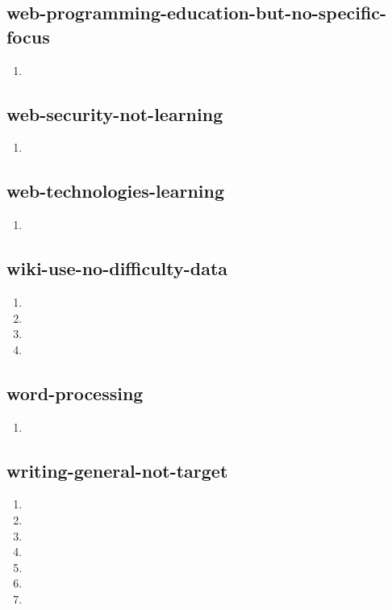 \documentclass{article}
\begin{document}
\subsection{web-programming-education-but-no-specific-focus}
\begin{enumerate}
\item {}
\end{enumerate}

\subsection{web-security-not-learning}
\begin{enumerate}
\item {}
\end{enumerate}

\subsection{web-technologies-learning}
\begin{enumerate}
\item {}
\end{enumerate}

\subsection{wiki-use-no-difficulty-data}
\begin{enumerate}
\item {}
\item {}
\item {}
\item {}
\end{enumerate}

\subsection{word-processing}
\begin{enumerate}
\item {}
\end{enumerate}

\subsection{writing-general-not-target}
\begin{enumerate}
\item {}
\item {}
\item {}
\item {}
\item {}
\item {}
\item {}
\end{enumerate}
\end{document}
